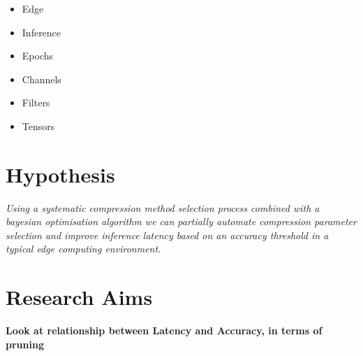 \documentclass[../Dissertation.tex]{subfiles}
\begin{document}
\begin{itemize}
    \item Edge
    \item Inference
    \item Epochs
    \item Channels
    \item Filters
    \item Tensors
\end{itemize}

\section{Hypothesis}
\emph{Using a systematic compression method selection process combined with a bayesian optimisation algorithm we can partially automate compression parameter selection and improve inference latency based on an accuracy threshold in a typical edge computing environment.}

\section{Research Aims}
\textbf{\color{red}Look at relationship between Latency and Accuracy, in terms of pruning}
\end{document}
